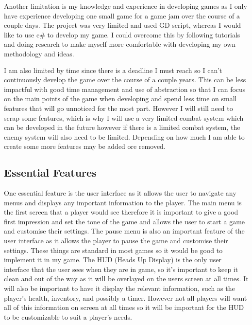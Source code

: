 \documentclass{article}
\newcommand{\parBr}{\vspace{5mm}}%
\begin{document}
\parBr

Another limitation is my knowledge and experience in developing games as I only have experience developing one small game for a game jam over the course of a couple days. The project was very limited and used GD script, whereas I would like to use c\# to develop my game. I could overcome  this by following tutorials and doing research to make myself more comfortable with developing my own methodology and ideas.

\parBr

I am also limited by time since there is a deadline I must reach so  I can't continuously develop the game over the course of a couple years. This can be less impactful with good time management and use of abstraction so that I can focus on the main points of the game when developing and spend less time on small features that will go unnoticed for the most part. However I will still need to scrap some features, which is why I will use a very limited combat system which can be developed in the future however if there is a limited combat system, the enemy system will also need to be limited. Depending on how much I am able to create some more features may be added ore removed.

\subsection{Essential Features}
One essential feature is the user interface as it allows the user to navigate any menus and displays any important information to the player. The main menu is the first screen that a player would see therefore it is important to give a good  first impression and set the tone of the game and allows the user to start a game and customise their settings. The pause menu is also an important feature of the user interface as it allows the player to pause the game and customise their settings. These things are standard in most games so it would be good to implement it in my game. The HUD (Heads Up Display) is the only user interface that the user sees when they are in game, so it's important to keep it clean and out of the way as it will be overlayed on the users screen at all times. It will also be important to have it display the relevant information, such as the player's health, inventory, and possibly a timer. However not all players will want all of this information on screen at all times so it will be important for the HUD to be customizable to suit a player's needs.

\parBr
\end{document}
